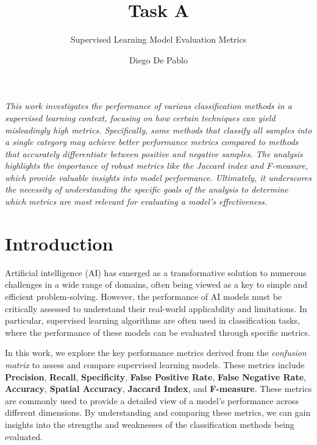 \documentclass{llncs}
\begin{document}
\title{Task A}
\subtitle{Supervised Learning Model Evaluation Metrics}

\author{Diego De Pablo}

\maketitle 

\vspace{1cm} %

\textit{
	This work investigates the performance of various classification methods in a supervised learning context, focusing on how certain techniques can yield misleadingly high metrics. Specifically, some methods that classify all samples into a single category may achieve better performance metrics compared to methods that accurately differentiate between positive and negative samples. The analysis highlights the importance of robust metrics like the Jaccard index and F-measure, which provide valuable insights into model performance. Ultimately, it underscores the necessity of understanding the specific goals of the analysis to determine which metrics are most relevant for evaluating a model’s effectiveness. }



\section{Introduction}

Artificial intelligence (AI) has emerged as a transformative solution to numerous challenges in a wide range of domains, often being viewed as a key to simple and efficient problem-solving. However, the performance of AI models must be critically assessed to understand their real-world applicability and limitations. In particular, supervised learning algorithms are often used in classification tasks, where the performance of these models can be evaluated through specific metrics.

In this work, we explore the key performance metrics derived from the \textit{confusion matrix} to assess and compare supervised learning models. These metrics include \textbf{Precision}, \textbf{Recall}, \textbf{Specificity}, \textbf{False Positive Rate}, \textbf{False Negative Rate}, \textbf{Accuracy}, \textbf{Spatial Accuracy}, \textbf{Jaccard Index}, and \textbf{F-measure}. These metrics are commonly used to provide a detailed view of a model’s performance across different dimensions. By understanding and comparing these metrics, we can gain insights into the strengths and weaknesses of the classification methods being evaluated.\cite{Liu2023}
\end{document}
